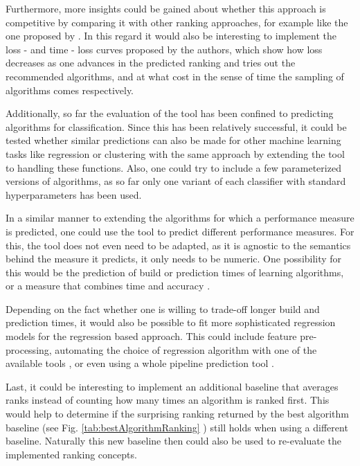 Furthermore, more insights could be gained about whether this approach is competitive by comparing it with other ranking approaches, for example like the one proposed by \citeauthor{DBLP:journals/ml/AbdulrahmanBRV18} \cite{DBLP:journals/ml/AbdulrahmanBRV18}. In this regard it would also be interesting  to implement the loss - and time - loss curves proposed by the authors, which show how loss decreases as one advances in the predicted ranking and tries out the recommended algorithms, and at what cost in the sense of time the sampling of algorithms comes respectively.

Additionally, so far the evaluation of the tool has been confined to predicting algorithms for classification. Since this has been relatively successful, it could be tested whether similar predictions can also be made for other machine learning tasks like regression or clustering with the same approach by extending the tool to handling these functions. Also, one could try to include a few parameterized versions of algorithms, as so far only one variant of each classifier with standard hyperparameters has been used. 

In a similar manner to extending the algorithms for which a performance measure is predicted, one could use the tool to predict different performance measures. For this, the tool does not even need to be adapted, as it is agnostic to the semantics behind the measure it predicts, it only needs to be numeric. One possibility for this would be the prediction of build or prediction times of learning algorithms, or a measure that combines time and accuracy \cite{DBLP:journals/ml/AbdulrahmanBRV18}.

Depending on the fact whether one is willing to trade-off longer build and prediction times, it would also be possible to fit more sophisticated regression models for the regression based approach. This could include feature pre-processing, automating the choice of regression algorithm with one of the available tools \cite{thornton2013auto} \cite{feurer2015efficient}, or even using a whole pipeline prediction tool \cite{wever2017automatic} \cite{DBLP:conf/eurogp/SaPOP17}.

Last, it could be interesting to implement an additional baseline that averages ranks instead of counting how many times an algorithm is ranked first. This would help to determine if the surprising ranking returned by the best algorithm baseline (see Fig. \ref{tab:bestAlgorithmRanking}
) still holds when using a different baseline. Naturally this new baseline then could also be used to re-evaluate the implemented ranking concepts. 


